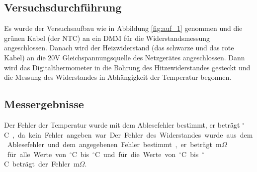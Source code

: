\documentclass[12pt,a4paper]{article}
\begin{document}
\subsection{Versuchsdurchführung}

Es wurde der Versuchsaufbau wie in Abbildung \ref{fig:auf_1} genommen und die grünen Kabel (der NTC) an ein DMM für die Widerstandsmessung angeschlossen. Danach wird der Heizwiderstand (das schwarze und das rote Kabel) an die 20V Gleichspannungsquelle des Netzgerätes angeschlossen. Dann wird das Digitalthermometer in die Bohrung des Hitzewiderstandes gesteckt und die Messung des Widerstandes in Abhängigkeit der Temperatur begonnen.

\subsection{Messergebnisse}

Der Fehler der Temperatur wurde mit dem Ablesefehler bestimmt, er beträgt \unit[0,1]{$^\circ$C}, da kein Fehler angeben war. Der Fehler des Widerstandes wurde aus dem Ablesefehler und dem angegebenen Fehler bestimmt, er beträgt \unit[60]{m$\Omega$} für alle Werte von \unit[21,4]{$^\circ$C} bis \unit[58]{$^\circ$C} und für die Werte von \unit[59]{$^\circ$C} bis \unit[69]{$^\circ$C} beträgt der Fehler \unit[6]{m$\Omega$}.
\end{document}
